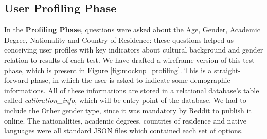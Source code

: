 \subsection{User Profiling Phase}
\label{subsec:design_profiling}
%
In the \textbf{Profiling Phase}, questions were asked about the Age, Gender, Academic Degree, Nationality and Country of Residence: these
questions helped us conceiving user profiles with key indicators about cultural background and gender relation to results of each test.
%
We have drafted a wireframe version of this test phase, which is present in Figure \ref{fig:mockup_profiling}. This is a straight-forward
phase, in which the user is asked to indicate some demographic informations. All of these informations are stored in a relational database's
table called \emph{calibration\_info}, which will be entry point of the database. We had to include the \ul{Other} gender type, since it was
mandatory by Reddit to publish it online. The nationalities, academic degrees, countries of residence and native languages were all standard
JSON files which contained each set of options. \par
%
